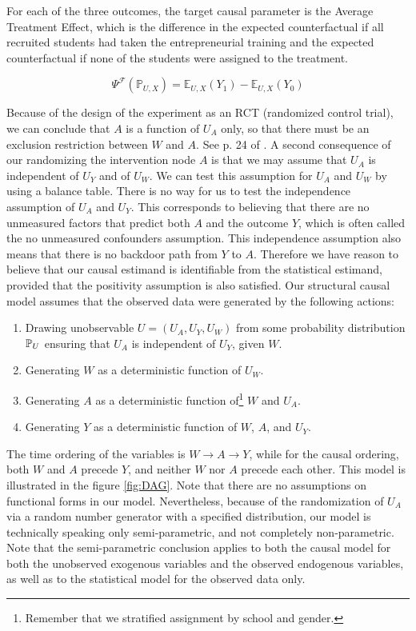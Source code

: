 For each of the three outcomes, the target causal parameter is the Average Treatment Effect, which is the difference in the expected counterfactual if all recruited students had taken the entrepreneurial training and the expected counterfactual if none of the students were assigned to the treatment.

\[ \Psi^{\mathcal{F}}(\mathbb{P}_{U,X}) = \mathbb{E}_{U,X}(Y_1) - \mathbb{E}_{U,X}(Y_0)  \]

Because of the design of the experiment as an RCT (randomized control trial), we can conclude that $A$ is a function of $U_A$ only, so that there must be an exclusion restriction between $W$ and $A$. See p. 24 of \cite{tlb}. A second consequence of our randomizing the intervention node $A$ is that we may assume that $U_A$ is independent of $U_Y$ and of $U_W$. We can test this assumption for $U_A$ and $U_W$ by using a balance table. There is no way for us to test the independence assumption of $U_A$ and $U_Y$. This corresponds to believing that there are no unmeasured factors that predict both $A$ and the outcome $Y$, which is often called the no unmeasured confounders assumption. This independence assumption also means that there is no backdoor path from $Y$ to $A$. Therefore we have reason to believe that our causal estimand is identifiable from the statistical estimand, provided that the positivity assumption is also satisfied. Our structural causal model assumes that the observed data were generated by the following actions: \\

\begin{enumerate}
\item Drawing unobservable $U=(U_A, U_Y, U_W)$ from some probability distribution $\mathbb{P}_U$ ensuring that $U_A$ is independent of $U_Y$, given $W$.
\item Generating $W$ as a deterministic function of $U_W$.
\item Generating $A$ as a deterministic function of\footnote{Remember that we stratified assignment by school and gender.} $W$ and $U_A$.
\item Generating $Y$ as a deterministic function of $W$, $A$, and $U_Y$.
\end{enumerate} 

The time ordering of the variables is $W \to A \to Y$, while for the causal ordering, both $W$ and $A$ precede $Y$, and neither $W$ nor $A$ precede each other. This model is illustrated in the figure \ref{fig:DAG}. Note that there are no assumptions on functional forms in our model. Nevertheless, because of the randomization of $U_A$ via a random number generator with a specified distribution, our model is technically speaking only semi-parametric, and not completely non-parametric. Note that the semi-parametric conclusion applies to both the causal model for both the unobserved exogenous variables and the observed endogenous variables, as well as to the statistical model for the observed data only.\\

